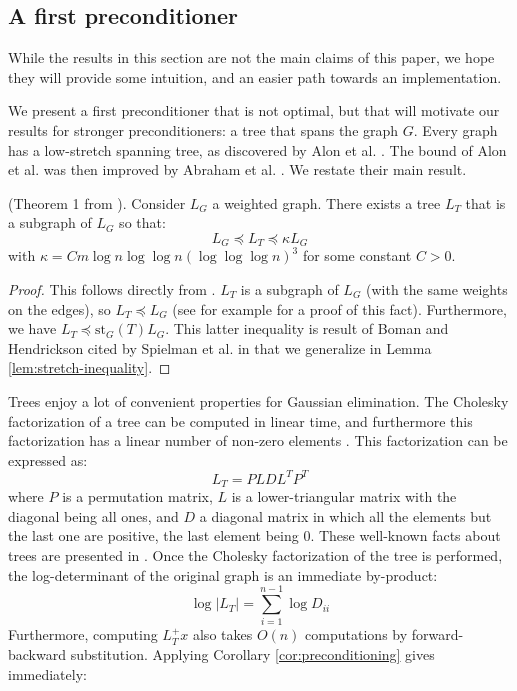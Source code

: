 
\subsection{A first preconditioner\label{sec:A-first-preconditioner}}

While the results in this section are not the main claims of this
paper, we hope they will provide some intuition, and an easier path
towards an implementation.

We present a first preconditioner that is not optimal, but that will
motivate our results for stronger preconditioners: a tree that spans
the graph $G$. Every graph has a low-stretch spanning tree, as discovered
by Alon et al. \cite{Alon1995}. The bound of Alon et al. was then
improved by Abraham et al. \cite{Abraham2008}. We restate their main
result. \begin{lemma}(Theorem 1 from \cite{Abraham2008}). Consider
$L_{G}$ a weighted graph. There exists a tree $L_{T}$ that is a
subgraph of $L_{G}$ so that: 
\[
L_{G}\preceq L_{T}\preceq\kappa L_{G}
\]
with $\kappa=Cm\log n\log\log n\left(\log\log\log n\right)^{3}$ for
some constant $C>0$.\end{lemma} 

\begin{proof} This follows directly from \cite{Abraham2008}. $L_{T}$
is a subgraph of $L_{G}$ (with the same weights on the edges), so
$L_{T}\preceq L_{G}$ (see \cite{Spielman2009a} for example for a
proof of this fact). Furthermore, we have $L_{T}\preceq\text{st}_{G}\left(T\right)L_{G}$.
This latter inequality is result of Boman and Hendrickson \cite{Boman2004}
cited by Spielman et al. in \cite{Spielman2010} that we generalize
in Lemma \ref{lem:stretch-inequality}. \end{proof}

Trees enjoy a lot of convenient properties for Gaussian elimination.
The Cholesky factorization of a tree can be computed in linear time,
and furthermore this factorization has a linear number of non-zero
elements \cite{Spielman2009a}. This factorization can be expressed
as: 
\[
L_{T}=PLDL^{T}P^{T}
\]
where $P$ is a permutation matrix, $L$ is a lower-triangular matrix
with the diagonal being all ones, and $D$ a diagonal matrix in which
all the elements but the last one are positive, the last element being
$0$. These well-known facts about trees are presented in \cite{Spielman2009a}.
Once the Cholesky factorization of the tree is performed, the log-determinant
of the original graph is an immediate by-product: 
\[
\log\left|L_{T}\right|=\sum_{i=1}^{n-1}\log D_{ii}
\]
Furthermore, computing $L_{T}^{+}x$ also takes $O\left(n\right)$
computations by forward-backward substitution. Applying Corollary
\ref{cor:preconditioning} gives immediately: 

